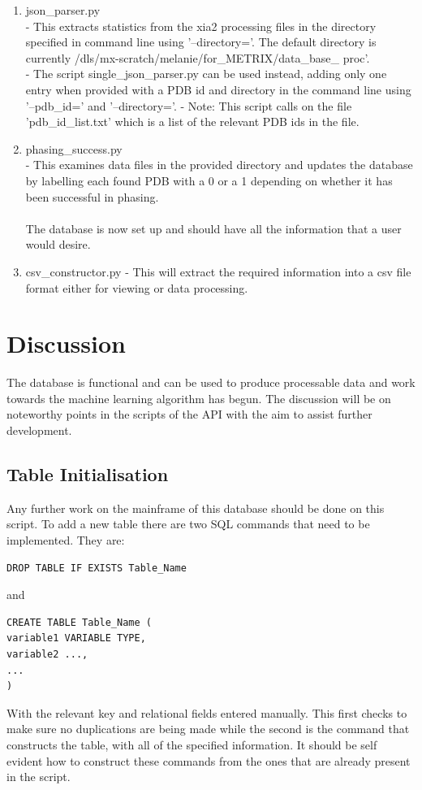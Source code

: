 \documentclass[11pt, a4paper]{article}
\begin{document}
\begin{multicols}{2}
\begin{enumerate}
\item json\_parser.py\\
- This extracts statistics from the xia2 processing files in the directory specified in command line using '--directory='. The default directory is currently /dls/mx-scratch/melanie/for\_METRIX/data\_base\_ proc'.\\
- The script single\_json\_parser.py can be used instead, adding only one entry when provided with a PDB id and directory in the command line using '--pdb\_id=' and '--directory='. 
- Note: This script calls on the file 'pdb\_id\_list.txt' which is a list of the relevant PDB ids in the file.

\item phasing\_success.py\\
- This examines data files in the provided directory and updates the database by labelling each found PDB with a 0 or a 1 depending on whether it has been successful in phasing.\\
\\
The database is now set up and should have all the information that a user would desire.

\item csv\_constructor.py
- This will extract the required information into a csv file format either for viewing or data processing.
\end{enumerate}
\section{Discussion}
The database is functional and can be used to produce processable data and work towards the machine learning algorithm has begun. The discussion will be on noteworthy points in the scripts of the API with the aim to assist further development.
\subsection{Table Initialisation}
Any further work on the mainframe of this database should be done on this script. To add a new table there are two SQL commands that need to be implemented. They are:
\begin{verbatim}
DROP TABLE IF EXISTS Table_Name
\end{verbatim}
and
\begin{verbatim}
CREATE TABLE Table_Name (
variable1 VARIABLE TYPE,
variable2 ...,
...
)
\end{verbatim}
With the relevant key and relational fields entered manually. This first checks to make sure no duplications are being made while the second is the command that constructs the table, with all of the specified information. It should be self evident how to construct these commands from the ones that are already present in the script. 

\end{multicols}
\end{document}
